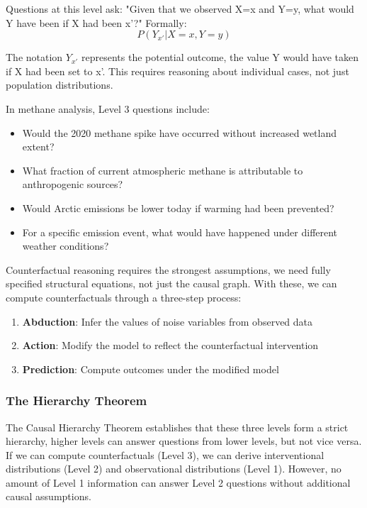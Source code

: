 Questions at this level ask: "Given that we observed X=x and Y=y, what would Y have been if X had been x'?" Formally:
\begin{equation}
P(Y_{x'}|X=x, Y=y)
\end{equation}

The notation $Y_{x'}$ represents the potential outcome, the value Y would have taken if X had been set to x'. This requires reasoning about individual cases, not just population distributions.

In methane analysis, Level 3 questions include:
\begin{itemize}
\item Would the 2020 methane spike have occurred without increased wetland extent?
\item What fraction of current atmospheric methane is attributable to anthropogenic sources?
\item Would Arctic emissions be lower today if warming had been prevented?
\item For a specific emission event, what would have happened under different weather conditions?
\end{itemize}

Counterfactual reasoning requires the strongest assumptions, we need fully specified structural equations, not just the causal graph. With these, we can compute counterfactuals through a three-step process:
\begin{enumerate}
\item \textbf{Abduction}: Infer the values of noise variables from observed data
\item \textbf{Action}: Modify the model to reflect the counterfactual intervention
\item \textbf{Prediction}: Compute outcomes under the modified model
\end{enumerate}

\subsubsection{The Hierarchy Theorem}

The Causal Hierarchy Theorem establishes that these three levels form a strict hierarchy, higher levels can answer questions from lower levels, but not vice versa. If we can compute counterfactuals (Level 3), we can derive interventional distributions (Level 2) and observational distributions (Level 1). However, no amount of Level 1 information can answer Level 2 questions without additional causal assumptions.

